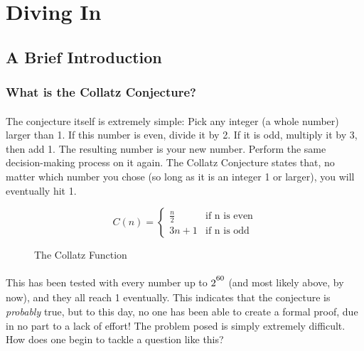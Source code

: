 \documentclass[12pt,letterpaper]{article}
\begin{document}
		
		\newpage
		
	
	\section{Diving In}
	
		\subsection{A Brief Introduction}
		
			\subsubsection{What is the Collatz Conjecture?}
			
				\paragraph{} The conjecture itself is extremely simple: Pick any integer (a whole number) larger than 1. If this number is even, divide it by 2. If it is odd, multiply it by 3, then add 1. The resulting number is your new number. Perform the same decision-making process on it again. The Collatz Conjecture states that, no matter which number you chose (so long as it is an integer 1 or larger), you will eventually hit 1.
				
				\begin{figure}[h] 
					\begin{displaymath} 
					C(n) = 
					\begin{cases}
					\frac{n}{2} &\text{if n is even}\\
					3n+1 &\text{if n is odd}
					\end{cases}
					\end{displaymath}
					
					\caption{The Collatz Function}
					\label{function:collatz}
				\end{figure}
				
				
				\paragraph{} This has been tested with every number up to $2\strut^{60}$ (and most likely above, by now), and they all reach 1 eventually. This indicates that the conjecture is \textit{probably} true, but to this day, no one has been able to create a formal proof, due in no part to a lack of effort! The problem posed is simply extremely difficult. How does one begin to tackle a question like this?
				
\end{document}

